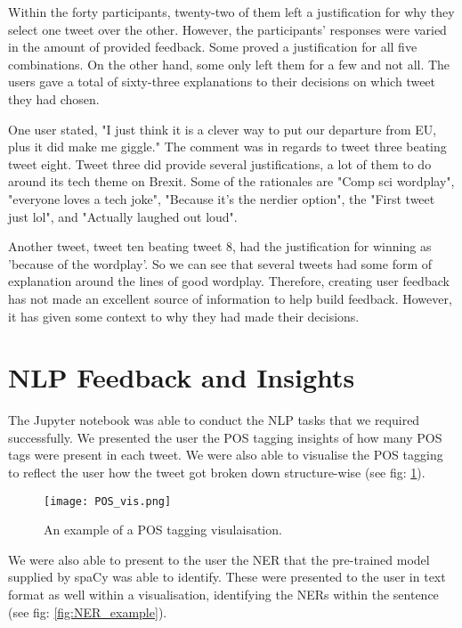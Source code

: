 	Within the forty participants, twenty-two of them left a justification for why they select one tweet over the other. However, the participants' responses were varied in the amount of provided feedback. Some proved a justification for all five combinations. On the other hand, some only left them for a few and not all. The users gave a total of sixty-three explanations to their decisions on which tweet they had chosen.
	
	One user stated, "I just think it is a clever way to put our departure from EU, plus it did make me giggle." The comment was in regards to tweet three beating tweet eight. Tweet three did provide several justifications, a lot of them to do around its tech theme on Brexit. Some of the rationales are "Comp sci wordplay", "everyone loves a tech joke", "Because it's the nerdier option", the "First tweet just lol", and "Actually laughed out loud".
	
	Another tweet, tweet ten beating tweet 8, had the justification for winning as 'because of the wordplay'. So we can see that several tweets had some form of explanation around the lines of good wordplay. Therefore, creating user feedback has not made an excellent source of information to help build feedback. However, it has given some context to why they had made their decisions.


\section{NLP Feedback and Insights}
\label{sec:reaults_NLP}
	
	The Jupyter notebook was able to conduct the NLP tasks that we required successfully. We presented the user the POS tagging insights of how many POS tags were present in each tweet. We were also able to visualise the POS tagging to reflect the user how the tweet got broken down structure-wise (see fig: \ref{fig:POS_example}).
	
	\begin{figure}[h]
		\centering
		\texttt{[image: POS\_vis.png]}
		\caption{An example of a POS tagging visulaisation.}
		\label{fig:POS_example}
		
	\end{figure}

	We were also able to present to the user the NER that the pre-trained model supplied by spaCy was able to identify. These were presented to the user in text format as well within a visualisation, identifying the NERs within the sentence (see fig: \ref{fig:NER_example}).
	

